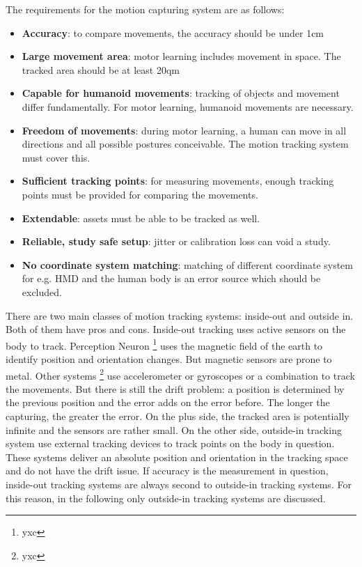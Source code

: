 The requirements for the motion capturing system are as follows: 
\begin{itemize}
	\item \textbf{Accuracy}: to compare movements, the accuracy should be under 1cm
	\item \textbf{Large movement area}: motor learning includes movement in space. The tracked area should be at least 20qm
	\item \textbf{Capable for humanoid movements}: tracking of objects and movement differ fundamentally. For motor learning, humanoid movements are necessary.
	\item \textbf{Freedom of movements}: during motor learning, a human can move in all directions and all possible postures conceivable. The motion tracking system must cover this.
	\item \textbf{Sufficient tracking points}: for measuring movements, enough tracking points must be provided for comparing the movements.
	\item \textbf{Extendable}: assets must be able to be tracked as well.
	\item \textbf{Reliable, study safe setup}: jitter or calibration loss can void a study.
	\item \textbf{No coordinate system matching}: matching of different coordinate system for e.g. HMD and the human body is an error source which should be excluded.
\end{itemize}
There are two main classes of motion tracking systems: inside-out and outside in. Both of them have pros and cons. Inside-out tracking uses active sensors on the body to track. Perception Neuron \footnote{yxc} uses the magnetic field of the earth to identify position and orientation changes. But magnetic sensors are prone to metal. Other systems \footnote{yxc} use accelerometer or gyroscopes or a combination to track the movements. But there is still the drift problem: a position is determined by the previous position and the error adds on the error before. The longer the capturing, the greater the error. On the plus side, the tracked area is potentially infinite and the sensors are rather small. On the other side, outside-in tracking system use external tracking devices to track points on the body in question. These systems deliver an absolute position and orientation in the tracking space and do not have the drift issue. If accuracy is the measurement in question, inside-out tracking systems are always second to outside-in tracking systems. For this reason, in the following only outside-in tracking systems are discussed. %
